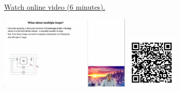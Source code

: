 
\begin{minipage}{10cm}
    \href{https://act4e-spring21.netlify.app/videos/spring2021-functorial-comp-a:solving-queries:multi-loop.html}{Watch online video (6 minutes).}
        
    \href{https://act4e-spring21.netlify.app/videos/spring2021-functorial-comp-a:solving-queries:multi-loop.html}{\includegraphics[height=3.5cm]{spring2021-functorial-comp-a:solving-queries:multi-loop/thumbnails.jpg}}
    \href{https://act4e-spring21.netlify.app/videos/spring2021-functorial-comp-a:solving-queries:multi-loop.html}{\includegraphics[height=2.5cm]{spring2021-functorial-comp-a:solving-queries:multi-loop/qrcode.png}}
\end{minipage}
